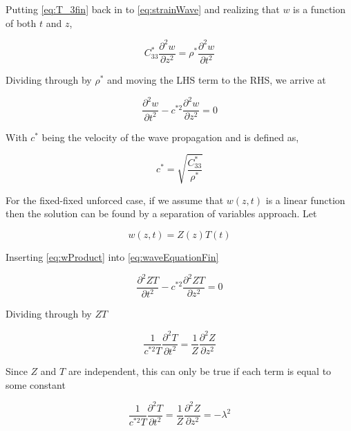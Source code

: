 Putting \ref{eq:T_3fin} back in to \ref{eq:strainWave} and realizing that $w$ is a function of both $t$ and $z$,

\begin{equation}
C^*_{33}\frac{\partial ^2w}{\partial z^2} = \rho^* \frac{\partial ^2w}{\partial t^2}
\end{equation}

Dividing through by $\rho^*$ and moving the LHS term to the RHS, we arrive at

\begin{equation}
\frac{\partial ^2w}{\partial t^2} - c^{*2} \frac{\partial ^2w}{\partial z^2} = 0
\label{eq:waveEquationFin}
\end{equation}


With $c^*$ being the velocity of the wave propagation and is defined as,

\begin{equation}
c^* = \sqrt{\frac{C^*_{33}}{\rho^*}}
\end{equation}

For the fixed-fixed unforced case, if we assume that $w(z,t)$ is a linear function then the solution can be found by a separation of variables approach. Let 

\begin{equation}
w(z,t) = Z(z)T(t)
\label{eq:wProduct}
\end{equation}

Inserting \ref{eq:wProduct} into \ref{eq:waveEquationFin}

\begin{equation}
\frac{\partial ^2ZT}{\partial t^2} - c^{*2} \frac{\partial ^2ZT}{\partial z^2} = 0
\label{eq:waveEquationSub}
\end{equation}

Dividing through by $ZT$

\begin{equation}
\frac{1}{c^{*2}T}\frac{\partial ^2T}{\partial t^2} =  \frac{1}{Z}\frac{\partial ^2Z}{\partial z^2}
\label{eq:waveEquationDiv}
\end{equation}

Since $Z$ and $T$ are independent, this can only be true if each term is equal to some constant

\begin{equation}
\frac{1}{c^{*2}T}\frac{\partial ^2T}{\partial t^2} =  \frac{1}{Z}\frac{\partial ^2Z}{\partial z^2} = -\lambda ^2
\label{eq:waveEquationConst}
\end{equation}

